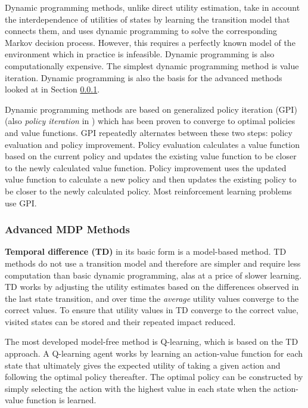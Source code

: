 Dynamic programming methods, unlike direct utility estimation, take in account
the interdependence of utilities of states by learning the transition model
that connects them, and uses dynamic programming to solve the corresponding
Markov decision process. However, this requires a perfectly known model of the
environment which in practice is infeasible. Dynamic programming is also
computationally expensive. The simplest dynamic programming method is value
iteration. Dynamic programming is also the basis for the advanced methods
looked at in Section \ref{sec:ai:mdp:methods:advanced}.
\parencite{Sutton1998ai+reinforcement}

Dynamic programming methods are based on generalized policy iteration (GPI)
(also \textit{policy iteration} in \textcite{Russell2010ai+modern}) which has
been proven to converge to optimal policies and value functions. GPI repeatedly
alternates between these two steps: policy evaluation and policy improvement.
Policy evaluation calculates a value function based on the current policy and
updates the existing value function to be closer to the newly calculated value
function. Policy improvement uses the updated value function to calculate a new
policy and then updates the existing policy to be closer to the newly
calculated policy. Most reinforcement learning problems use GPI.
\parencite{Sutton1998ai+reinforcement}

\subsubsection{Advanced MDP Methods}
\label{sec:ai:mdp:methods:advanced}

\textbf{Temporal difference (TD)} in its basic form is a model-based method. TD
methods do not use a transition model and therefore are simpler and require
less computation than basic dynamic programming, alas at a price of slower
learning. TD works by adjusting the utility estimates based on the differences
observed in the last state transition, and over time the \textit{average}
utility values converge to the correct values. To ensure that utility values in
TD converge to the correct value, visited states can be stored and their
repeated impact reduced. \parencite{Russell2010ai+modern}

The most developed model-free method is Q-learning, which is based on the TD
approach. A Q-learning agent works by learning an action-value function for
each state that ultimately gives the expected utility of taking a given action
and following the optimal policy thereafter. The optimal policy can be
constructed by simply selecting the action with the highest value in each state
when the action-value function is learned.


